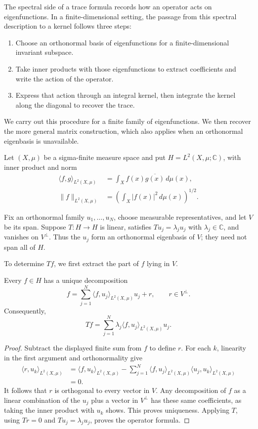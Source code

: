 \label{finite-kernel-model}

The spectral side of a trace formula records how an operator acts on eigenfunctions. In a finite-dimensional setting, the passage from this spectral description to a kernel follows three steps:
\begin{enumerate}
\item Choose an orthonormal basis of eigenfunctions for a finite-dimensional invariant subspace.
\item Take inner products with those eigenfunctions to extract coefficients and write the action of the operator.
\item Express that action through an integral kernel, then integrate the kernel along the diagonal to recover the trace.
\end{enumerate}
We carry out this procedure for a finite family of eigenfunctions. We then recover the more general matrix construction, which also applies when an orthonormal eigenbasis is unavailable.

Let $(X,\mu)$ be a sigma-finite measure space and put $H=L^2(X,\mu;\mathbb C)$, with inner product and norm
\[
\begin{aligned}
\langle f,g\rangle_{L^2(X,\mu)}&=\int_X f(x)\overline{g(x)}\,d\mu(x),\\
\|f\|_{L^2(X,\mu)}&=\left(\int_X|f(x)|^2\,d\mu(x)\right)^{1/2}.
\end{aligned}
\]

Fix an orthonormal family $u_1,\ldots,u_N$, choose measurable representatives, and let $V$ be its span. Suppose $T:H\to H$ is linear, satisfies $Tu_j=\lambda_j u_j$ with $\lambda_j\in\mathbb C$, and vanishes on $V^\perp$. Thus the $u_j$ form an orthonormal eigenbasis of $V$; they need not span all of $H$.

To determine $Tf$, we first extract the part of $f$ lying in $V$.

\begin{proposition}\label{finite-orthonormal-coefficients}
Every $f\in H$ has a unique decomposition
\[
f=\sum_{j=1}^N\langle f,u_j\rangle_{L^2(X,\mu)}u_j+r,
\qquad r\in V^\perp.
\]
Consequently,
\[
Tf=\sum_{j=1}^N\lambda_j\langle f,u_j\rangle_{L^2(X,\mu)}u_j.
\]
\end{proposition}

\begin{proof}
Subtract the displayed finite sum from $f$ to define $r$. For each $k$, linearity in the first argument and orthonormality give
\[
\begin{aligned}
\langle r,u_k\rangle_{L^2(X,\mu)}
&=\langle f,u_k\rangle_{L^2(X,\mu)}
-\sum_{j=1}^N\langle f,u_j\rangle_{L^2(X,\mu)}
 \langle u_j,u_k\rangle_{L^2(X,\mu)}\\
&=0.
\end{aligned}
\]
It follows that $r$ is orthogonal to every vector in $V$. Any decomposition of $f$ as a linear combination of the $u_j$ plus a vector in $V^\perp$ has these same coefficients, as taking the inner product with $u_k$ shows. This proves uniqueness. Applying $T$, using $Tr=0$ and $Tu_j=\lambda_j u_j$, proves the operator formula.
\end{proof}

